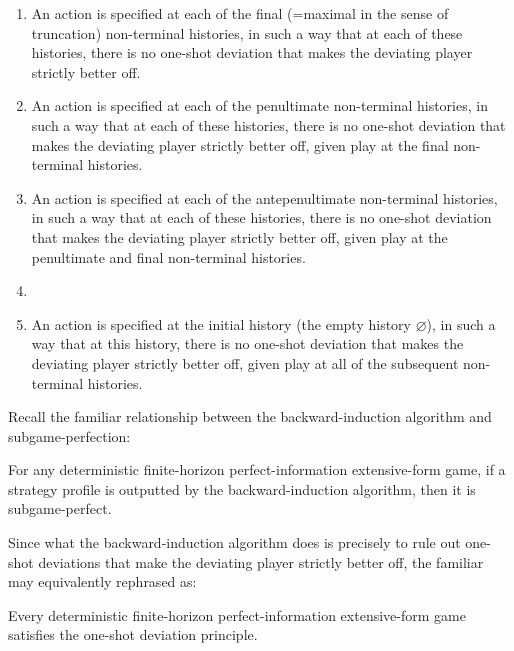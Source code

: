 \begin{enumerate}

	\item \label{item:backward_induction:1} An action is specified at each of the final (=maximal in the sense of truncation) non-terminal histories, in such a way that at each of these histories, there is no one-shot deviation that makes the deviating player strictly better off.

	\item \label{item:backward_induction:2} An action is specified at each of the penultimate non-terminal histories, in such a way that at each of these histories, there is no one-shot deviation that makes the deviating player strictly better off, given play at the final non-terminal histories.

	\item \label{item:backward_induction:3} An action is specified at each of the antepenultimate non-terminal histories, in such a way that at each of these histories, there is no one-shot deviation that makes the deviating player strictly better off, given play at the penultimate and final non-terminal histories.

	\item[\vdots]

	\item[($T$)] An action is specified at the initial history (the empty history $\varnothing$), in such a way that at this history, there is no one-shot deviation that makes the deviating player strictly better off, given play at all of the subsequent non-terminal histories.

\end{enumerate}

Recall the familiar relationship between the backward-induction algorithm and subgame-perfection:

\begin{fact}
	\label{fact:bi_spne}
	For any deterministic finite-horizon perfect-information extensive-form game, if a strategy profile is outputted by the backward-induction algorithm, then it is subgame-perfect.
\end{fact}

Since what the backward-induction algorithm does is precisely to rule out one-shot deviations that make the deviating player strictly better off, the familiar  may equivalently rephrased as:

\begin{proposition}
	\label{proposition:osdp_finite}
	Every deterministic finite-horizon perfect-information exten\-sive-form game satisfies the one-shot deviation principle.
\end{proposition}

